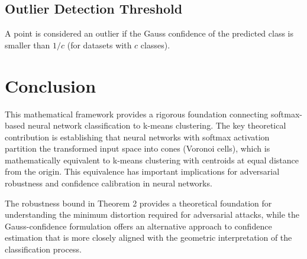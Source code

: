 \subsection{Outlier Detection Threshold}

A point is considered an outlier if the Gauss confidence of the predicted class is smaller than $1/c$ (for datasets with $c$ classes).

\section{Conclusion}

This mathematical framework provides a rigorous foundation connecting softmax-based neural network classification to k-means clustering. The key theoretical contribution is establishing that neural networks with softmax activation partition the transformed input space into cones (Voronoi cells), which is mathematically equivalent to k-means clustering with centroids at equal distance from the origin. This equivalence has important implications for adversarial robustness and confidence calibration in neural networks.

The robustness bound in Theorem 2 provides a theoretical foundation for understanding the minimum distortion required for adversarial attacks, while the Gauss-confidence formulation offers an alternative approach to confidence estimation that is more closely aligned with the geometric interpretation of the classification process.

